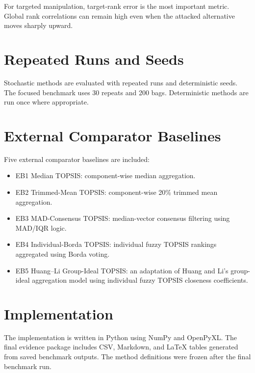 For targeted manipulation, target-rank error is the most important metric. Global rank correlations can remain high even when the attacked alternative moves sharply upward.

\section{Repeated Runs and Seeds}
Stochastic methods are evaluated with repeated runs and deterministic seeds. The focused benchmark uses 30 repeats and 200 bags. Deterministic methods are run once where appropriate.

\section{External Comparator Baselines}
Five external comparator baselines are included:

\begin{itemize}
    \item EB1 Median TOPSIS: component-wise median aggregation.
    \item EB2 Trimmed-Mean TOPSIS: component-wise 20\% trimmed mean aggregation.
    \item EB3 MAD-Consensus TOPSIS: median-vector consensus filtering using MAD/IQR logic.
    \item EB4 Individual-Borda TOPSIS: individual fuzzy TOPSIS rankings aggregated using Borda voting.
    \item EB5 Huang--Li Group-Ideal TOPSIS: an adaptation of Huang and Li's group-ideal aggregation model using individual fuzzy TOPSIS closeness coefficients.
\end{itemize}

\section{Implementation}
The implementation is written in Python using NumPy and OpenPyXL. The final evidence package includes CSV, Markdown, and LaTeX tables generated from saved benchmark outputs. The method definitions were frozen after the final benchmark run.
